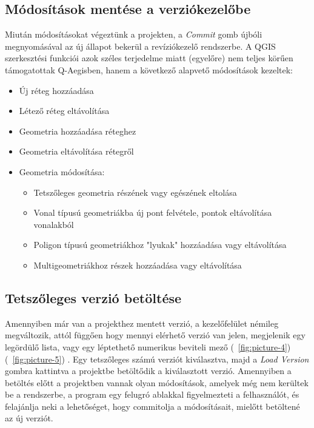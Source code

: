 \subsection{Módosítások mentése a verziókezelőbe}
Miután módosításokat végeztünk a projekten, a \emph{Commit} gomb újbóli megnyomásával az új állapot bekerül a revíziókezelő rendszerbe. A QGIS szerkesztési funkciói azok széles terjedelme miatt (egyelőre) nem teljes körűen támogatottak Q-Aegisben, hanem a következő alapvető módosítások kezeltek:
\begin{itemize}
	\item Új réteg hozzáadása
	\item Létező réteg eltávolítása
	\item Geometria hozzáadása réteghez
	\item Geometria eltávolítása rétegről
	\item Geometria módosítása:
	\begin{itemize}
		\item Tetszőleges geometria részének vagy egészének eltolása
		\item Vonal típusú geometriákba új pont felvétele, pontok eltávolítása vonalakból
		\item Poligon típusú geometriákhoz "lyukak" hozzáadása vagy eltávolítása
		\item Multigeometriákhoz részek hozzáadása vagy eltávolítása
	\end{itemize}	
\end{itemize}

\subsection{Tetszőleges verzió betöltése}
Amennyiben már van a projekthez mentett verzió, a kezelőfelület némileg megváltozik, attól függően hogy mennyi elérhető verzió van jelen, megjelenik egy legördülő lista, vagy egy léptethető numerikus beviteli mező (~\ref{fig:picture-4}) (~\ref{fig:picture-5}) . Egy tetszőleges számú verziót kiválasztva, majd a \textit{Load Version} gombra kattintva a projektbe betöltődik a kiválasztott verzió. Amennyiben a betöltés előtt a projektben vannak olyan módosítások, amelyek még nem kerültek be a rendszerbe, a program egy felugró ablakkal figyelmezteti a felhasználót, és felajánlja neki a lehetőséget, hogy commitolja a módosításait, mielőtt betöltené az új verziót.

